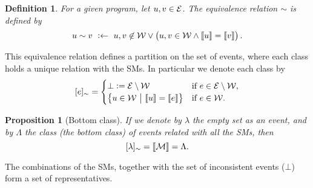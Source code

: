 \documentclass{tlp}
\newtheorem{definition}{Definition}
\newtheorem{proposition}{Proposition}
\newcommand{\cla}[1]{\ensuremath{{\cal #1}}}        %
\newcommand{\clause}{\ensuremath{\leftarrow}}
\newcommand{\MODELset}{\ensuremath{\cla{M}}}
\newcommand{\EVENTSset}{\ensuremath{\cla{E}}}
\newcommand{\CONSISTset}{\ensuremath{\cla{W}}}
\newcommand{\stablecore}[1]{\ensuremath{\left\llbracket #1 \right\rrbracket}}
\newcommand{\inconsistent}{\bot}
\newcommand{\given}{\ensuremath{~\middle|~}}
\newcommand{\bottomclass}{\ensuremath{\Lambda}}
\newcommand{\class}[1]{\ensuremath{[{#1}]_{\sim}}}
\newcommand{\emptyevent}{\ensuremath{\lambda}}
\newcommand{\franc}[1]{{\color{green!30!black}#1}}
\begin{document}
\begin{definition}\label{def:equiv.rel}
  For a given program, let $u, v \in \EVENTSset$.  The equivalence
  relation \(\sim\) is defined by
  \begin{equation}
        u \sim v\ :\clause\ u,v \not\in\CONSISTset \vee \del{u,v \in \CONSISTset \wedge \stablecore{u} = \stablecore{v}}.\label{eq:equiv.rel}
  \end{equation}
\end{definition}
This equivalence relation defines a partition on the set of events,
where each class holds a unique relation with the \aclp{SM}.  In
particular we denote each class by
\begin{equation}
    \class{e} =
    \begin{cases}
        \inconsistent := \EVENTSset \setminus \CONSISTset
         & \text{if~} e \in \EVENTSset \setminus \CONSISTset, \\
        \set{u \in \CONSISTset \given \stablecore{u} = \stablecore{e}}
         & \text{if~} e \in \CONSISTset.
    \end{cases}\label{eq:event.class}
\end{equation}

\franc{
\begin{proposition}[Bottom class]\label{prop:bottom.class}
  If we denote by \(\emptyevent\) the empty set as an event, and by
  \(\bottomclass\) the class (the \emph{bottom class}) of events
  related with all the \aclp{SM}, then
    \begin{equation}
        \class{\emptyevent} = \stablecore{\MODELset} = \bottomclass.
    \end{equation}    
\end{proposition}
}

The combinations of the \aclp{SM}, together with the set of
inconsistent events (\(\inconsistent\)) form a set of representatives.
\end{document}
